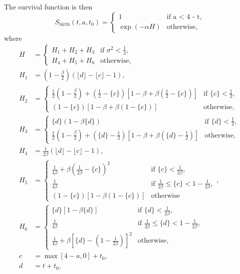\documentclass{jpmarticle}
\begin{document}
The survival function is then
\begin{equation}
  S_{\text{birth}}(t, a, t_0) =
  \begin{cases}
    1 & \text{if a < 4 - t},
    \\
    \exp(-\alpha H) & \text{otherwise},
  \end{cases}
\end{equation}
where
\begin{align}
  H &=
  \begin{cases}
    H_1 + H_2  + H_3
    & \text{if $\sigma^2 < \frac{1}{3}$},
    \\
    H_4 + H_5 + H_6
    & \text{otherwise},
  \end{cases}
  \\
  H_1 &= \left(1 - \frac{\beta}{2}\right)
  \left(\lfloor d \rfloor - \lfloor c \rfloor - 1\right),
  \\
  H_2 &=
  \begin{cases}
    \frac{1}{2} \left(1 - \frac{\beta}{2}\right)
    + \left(\frac{1}{2} - \{c\}\right)
    \left[1 - \beta
      + \beta \left(\frac{1}{2} - \{c\}\right)\right]
    & \text{if $\{c\} < \frac{1}{2}$},
    \\
    \left(1 - \{c\}\right)
    \left[1 - \beta + \beta \left(1 - \{c\}\right)\right]
    & \text{otherwise},
  \end{cases}
  \\
  H_3 &=
  \begin{cases}
    \{d\}\left(1 - \beta \{d\}\right)
    & \text{if $\{d\} < \frac{1}{2}$},
    \\
    \frac{1}{2} \left(1 - \frac{\beta}{2}\right)
    + \left(\{d\} - \frac{1}{2}\right)
    \left[1 - \beta + \beta \left(\{d\} - \frac{1}{2}\right)\right]
    & \text{otherwise},
    \end{cases}
  \\
  H_4 &= \frac{1}{2 \beta}
  \left(\lfloor d \rfloor - \lfloor c \rfloor - 1\right),
  \\
  H_5 &=
  \begin{cases}
    \frac{1}{4 \beta} + \beta \left(\frac{1}{2 \beta} - \{c\}\right)^2
    & \text{if $\{c\} < \frac{1}{2 \beta}$},
    \\
    \frac{1}{4 \beta}
    & \text{if $\frac{1}{2 \beta} \leq \{c\} < 1 - \frac{1}{2 \beta}$},
    \\
    \left(1 - \{c\}\right) \left[1 -
      \beta \left(1 - \{c\}\right)\right]
    & \text{otherwise}
  \end{cases},
  \\
  H_6 &=
  \begin{cases}
    \{d\} \left[1 - \beta \{d\}\right]
    & \text{if $\{d\} < \frac{1}{2 \beta}$},
    \\
    \frac{1}{4 \beta}
    & \text{if $\frac{1}{2 \beta} \leq \{d\} <
      1 - \frac{1}{2 \beta}$},
    \\
    \frac{1}{4 \beta} + \beta \left[\{d\} - \left(1
        - \frac{1}{2 \beta}\right)\right]^2
    & \text{otherwise},
  \end{cases}
  \\
  c &= \max[4 - a, 0] + t_0,
  \\
  d &= t + t_0,
\end{align}
\end{document}
